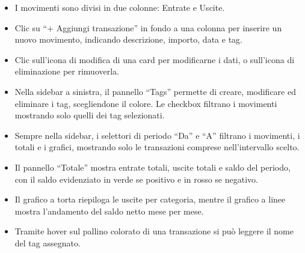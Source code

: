\documentclass[a4paper,12pt]{report}
\begin{document}
\begin{itemize}
  \item I movimenti sono divisi in due colonne: Entrate e Uscite.
  \item Clic su ``+ Aggiungi transazione'' in fondo a una colonna per inserire
    un nuovo movimento, indicando descrizione, importo, data e tag.
  \item Clic sull'icona di modifica di una card per
    modificarne i dati, o sull'icona di eliminazione per rimuoverla.
  \item Nella sidebar a sinistra, il pannello ``Tags'' permette di creare,
    modificare ed eliminare i tag, scegliendone il colore. Le checkbox filtrano
    i movimenti mostrando solo quelli dei tag selezionati.
  \item Sempre nella sidebar, i selettori di periodo ``Da'' e ``A'' filtrano i
    movimenti, i totali e i grafici, mostrando solo le transazioni comprese
    nell'intervallo scelto.
  \item Il pannello ``Totale'' mostra entrate totali, uscite totali e saldo del
    periodo, con il saldo evidenziato in verde se positivo e in rosso se
    negativo.
  \item Il grafico a torta riepiloga le uscite per categoria, mentre il grafico
    a linee mostra l'andamento del saldo netto mese per mese.
  \item Tramite hover sul pallino colorato di una transazione si può leggere il
    nome del tag assegnato.
\end{itemize}
\end{document}
